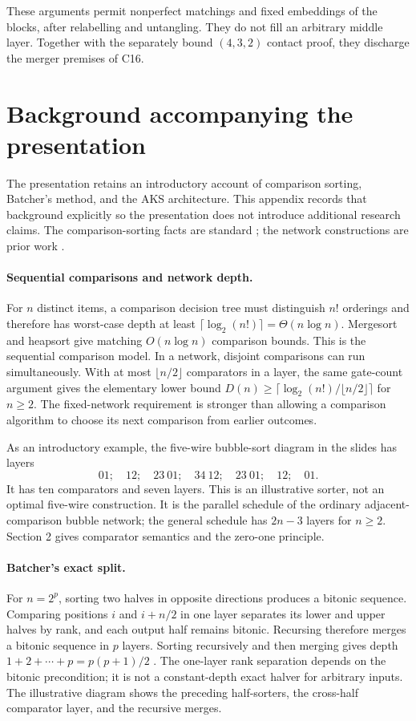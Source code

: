 \documentclass[11pt]{article}
\begin{document}
These arguments permit nonperfect matchings and fixed embeddings of the blocks, after relabelling and untangling. They do not fill an arbitrary middle layer. Together with the separately bound $(4,3,2)$ contact proof, they discharge the merger premises of C16.

\section{Background accompanying the presentation}\label{app:presentationbackground}
The presentation retains an introductory account of comparison sorting, Batcher's method, and the AKS architecture. This appendix records that background explicitly so the presentation does not introduce additional research claims. The comparison-sorting facts are standard \cite{knuth}; the network constructions are prior work \cite{batcher,aks,chvatal}.

\paragraph{Sequential comparisons and network depth.}
For $n$ distinct items, a comparison decision tree must distinguish $n!$ orderings and therefore has worst-case depth at least $\lceil\log_2(n!)\rceil=\Theta(n\log n)$. Mergesort and heapsort give matching $O(n\log n)$ comparison bounds. This is the sequential comparison model. In a network, disjoint comparisons can run simultaneously. With at most $\lfloor n/2\rfloor$ comparators in a layer, the same gate-count argument gives the elementary lower bound $D(n)\ge\lceil\log_2(n!)/\lfloor n/2\rfloor\rceil$ for $n\ge2$. The fixed-network requirement is stronger than allowing a comparison algorithm to choose its next comparison from earlier outcomes.

As an introductory example, the five-wire bubble-sort diagram in the slides has layers
\[
01;\quad12;\quad23\ 01;\quad34\ 12;\quad23\ 01;\quad12;\quad01.
\]
It has ten comparators and seven layers. This is an illustrative sorter, not an optimal five-wire construction. It is the parallel schedule of the ordinary adjacent-comparison bubble network; the general schedule has $2n-3$ layers for $n\ge2$. Section 2 gives comparator semantics and the zero-one principle.

\paragraph{Batcher's exact split.}
For $n=2^p$, sorting two halves in opposite directions produces a bitonic sequence. Comparing positions $i$ and $i+n/2$ in one layer separates its lower and upper halves by rank, and each output half remains bitonic. Recursing therefore merges a bitonic sequence in $p$ layers. Sorting recursively and then merging gives depth $1+2+\cdots+p=p(p+1)/2$ \cite{batcher}. The one-layer rank separation depends on the bitonic precondition; it is not a constant-depth exact halver for arbitrary inputs. The illustrative diagram shows the preceding half-sorters, the cross-half comparator layer, and the recursive merges.
\end{document}
